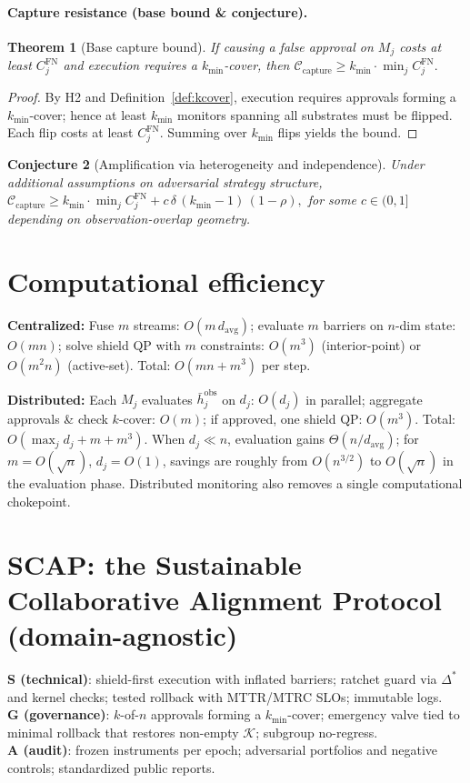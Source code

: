 \documentclass[11pt]{article}
\newtheorem{theorem}{Theorem}[section]
\newtheorem{conjecture}[theorem]{Conjecture}
\theoremstyle{definition}
\newcommand{\K}{\mathcal{K}}
\begin{document}
\paragraph{Capture resistance (base bound \& conjecture).}
\begin{theorem}[Base capture bound]\label{thm:captureBase}
If causing a false approval on $M_j$ costs at least $C_j^{\mathrm{FN}}$ and execution requires a $k_{\min}$-cover, then
\(
\mathcal C_{\mathrm{capture}} \ge k_{\min}\cdot \min_j C_j^{\mathrm{FN}}.
\)
\end{theorem}
\begin{proof}
By H2 and Definition~\ref{def:kcover}, execution requires approvals forming a $k_{\min}$-cover; hence at least $k_{\min}$ monitors spanning all substrates must be flipped. Each flip costs at least $C_j^{\mathrm{FN}}$. Summing over $k_{\min}$ flips yields the bound.
\end{proof}

\begin{conjecture}[Amplification via heterogeneity and independence]\label{conj:amplify}
Under additional assumptions on adversarial strategy structure,
\(
\mathcal C_{\mathrm{capture}} \ge k_{\min}\cdot \min_j C_j^{\mathrm{FN}} + c\,\delta\,(k_{\min}-1)\,(1-\rho),
\)
for some $c\in(0,1]$ depending on observation-overlap geometry.
\end{conjecture}

\section{Computational efficiency}
\textbf{Centralized:}
Fuse $m$ streams: $O(m\,d_{\mathrm{avg}})$; evaluate $m$ barriers on $n$-dim state: $O(mn)$; solve shield QP with $m$ constraints: $O(m^3)$ (interior-point) or $O(m^2 n)$ (active-set).
Total: $O(mn+m^3)$ per step.

\textbf{Distributed:}
Each $M_j$ evaluates $\bar h^{\mathrm{obs}}_j$ on $d_j$: $O(d_j)$ in parallel; aggregate approvals \& check $k$-cover: $O(m)$; if approved, one shield QP: $O(m^3)$.
Total: $O(\max_j d_j + m + m^3)$. When $d_j\ll n$, evaluation gains $\Theta(n/d_{\mathrm{avg}})$; for $m=O(\sqrt n)$, $d_j=O(1)$, savings are roughly from $O(n^{3/2})$ to $O(\sqrt n)$ in the evaluation phase. Distributed monitoring also removes a single computational chokepoint.

\section{SCAP: the Sustainable Collaborative Alignment Protocol (domain-agnostic)}
\textbf{S (technical)}: shield-first execution with inflated barriers; ratchet guard via $\Delta^\ast$ and kernel checks; tested rollback with MTTR/MTRC SLOs; immutable logs.\\
\textbf{G (governance)}: $k$-of-$n$ approvals forming a $k_{\min}$-cover; emergency valve tied to minimal rollback that restores non-empty $\K$; subgroup no-regress.\\
\textbf{A (audit)}: frozen instruments per epoch; adversarial portfolios and negative controls; standardized public reports.
\end{document}
